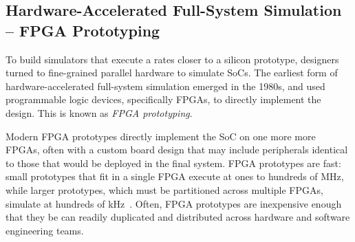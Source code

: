 \subsection{Hardware-Accelerated Full-System Simulation -- FPGA Prototyping}

To build simulators that execute a rates closer to a silicon prototype, designers turned
to fine-grained parallel hardware to simulate SoCs.  The earliest form of
hardware-accelerated full-system simulation emerged in the 1980s, and used
programmable logic devices, specifically FPGAs, to directly implement the
design. This is known as \emph{FPGA prototyping}.

Modern FPGA prototypes directly implement the SoC on one more
more FPGAs, often with a custom board design that may include peripherals
identical to those that would be deployed in the final system.  FPGA prototypes
are fast: small prototypes that fit in a single FPGA execute at ones to hundreds of
MHz, while larger prototypes, which must be partitioned across multiple FPGAs,
simulate at hundreds of kHz~\cite{nehalemprototype, atomprototype}.
Often, FPGA prototypes are inexpensive enough that they be can readily
duplicated and distributed across hardware and software engineering teams.

